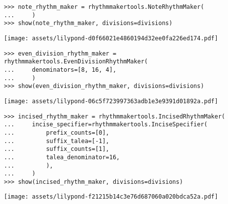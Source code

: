 \begin{comment}
<abjad>
note_rhythm_maker = rhythmmakertools.NoteRhythmMaker(
    )
show(note_rhythm_maker, divisions=divisions)
</abjad>
\end{comment}

\begin{singlespacing}
\vspace{-0.5\baselineskip}
\begin{lstlisting}
>>> note_rhythm_maker = rhythmmakertools.NoteRhythmMaker(
...     )
>>> show(note_rhythm_maker, divisions=divisions)
\end{lstlisting}
\noindent\texttt{[image: assets/lilypond-d0f66021e4860194d32ee0fa226ed174.pdf]}
\end{singlespacing}

\begin{comment}
<abjad>
even_division_rhythm_maker = rhythmmakertools.EvenDivisionRhythmMaker(
    denominators=[8, 16, 4],
    )
show(even_division_rhythm_maker, divisions=divisions)
</abjad>
\end{comment}

\begin{singlespacing}
\vspace{-0.5\baselineskip}
\begin{lstlisting}
>>> even_division_rhythm_maker = rhythmmakertools.EvenDivisionRhythmMaker(
...     denominators=[8, 16, 4],
...     )
>>> show(even_division_rhythm_maker, divisions=divisions)
\end{lstlisting}
\noindent\texttt{[image: assets/lilypond-06c5f723997363adb1e3e9391d01892a.pdf]}
\end{singlespacing}

\begin{comment}
<abjad>
incised_rhythm_maker = rhythmmakertools.IncisedRhythmMaker(
    incise_specifier=rhythmmakertools.InciseSpecifier(
        prefix_counts=[0],
        suffix_talea=[-1],
        suffix_counts=[1],
        talea_denominator=16,
        ),
    )
show(incised_rhythm_maker, divisions=divisions)
</abjad>
\end{comment}

\begin{singlespacing}
\vspace{-0.5\baselineskip}
\begin{lstlisting}
>>> incised_rhythm_maker = rhythmmakertools.IncisedRhythmMaker(
...     incise_specifier=rhythmmakertools.InciseSpecifier(
...         prefix_counts=[0],
...         suffix_talea=[-1],
...         suffix_counts=[1],
...         talea_denominator=16,
...         ),
...     )
>>> show(incised_rhythm_maker, divisions=divisions)
\end{lstlisting}
\noindent\texttt{[image: assets/lilypond-f21215b14c3e76d687060a020bdca52a.pdf]}
\end{singlespacing}

